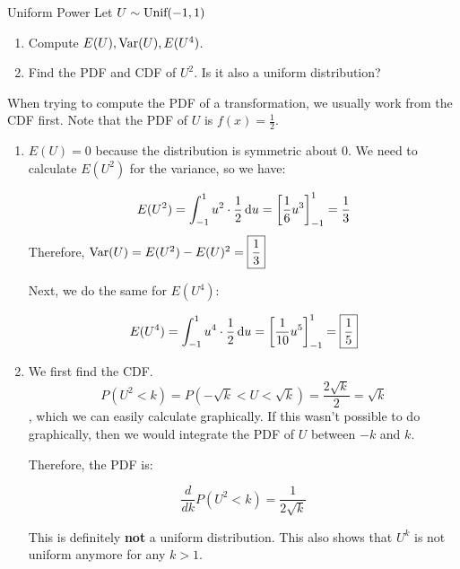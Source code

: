 \documentclass[11.5pt]{article}
\begin{document}
\begin{exercise}{Uniform Power} 
Let $U \sim \textrm{Unif}(-1,1)$
\begin{enumerate}
\item Compute $E(U), \textrm{Var}(U), E(U^4)$. 

\item Find the PDF and CDF of $U^2$. Is it also a uniform distribution? 
\end{enumerate}
\end{exercise}
\begin{solution}{3} 
When trying to compute the PDF of a transformation, we usually work from the CDF first. Note that the PDF of $U$ is $f(x) = \frac{1}{2}$. 
\begin{enumerate}
\item $E(U) = 0$ because the distribution is symmetric about 0. We need to calculate $E(U^2)$ for the variance, so we have:

$$ E(U^2) = \int_{-1}^{1} u^2 \cdot \frac{1}{2} \mathop{}\!\mathrm{d} u = \left[\frac{1}{6} u^3\right]_{-1}^{1} = \frac{1}{3}$$ 
Therefore, $\var\paren{U} = E(U^2) - E(U)^2 = \boxed{\frac{1}{3}}$ 

Next, we do the same for $E(U^4)$: 

$$ E(U^4) = \int_{-1}^{1} u^4 \cdot \frac{1}{2} \mathop{}\!\mathrm{d} u = \left[\frac{1}{10} u^5\right]_{-1}^{1} = \boxed{\frac{1}{5}}$$

\item We first find the CDF. $$P(U^2 < k) = P(-\sqrt{k} < U < \sqrt{k}) = \frac{2\sqrt{k}}{2} = \sqrt{k}$$, which we can easily calculate graphically. If this wasn't possible to do graphically, then we would integrate the PDF of $U$ between $-k$ and $k$. 

Therefore, the PDF is: 

$$ \frac{d}{dk} P(U^2 < k) = \boxed{\frac{1}{2 \sqrt{k}}}$$

This is definitely \textbf{not} a uniform distribution. This also shows that $U^k$ is not uniform anymore for any $k > 1$.
\end{enumerate}
\end{solution}



\end{document}
